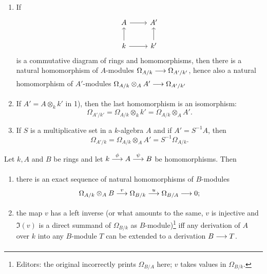 \documentclass[../main]{subfiles}
\begin{document}
\begin{exercise}
\begin{enumerate}[label = \arabic*)]
    \item\label{exe:26.01} If \[\begin{tikzcd}A \arrow[r] &A' \\ k \arrow[u] \arrow[r] &k'\arrow[u] \end{tikzcd}\] is a commutative diagram of rings and homomorphisms, then there is a natural homomorphism of $A$-modules $\Omega_{A / k} \varrightarrow{} \Omega_{A' / k'}$, hence also a natural homomorphism of $A'$-modules $\Omega_{A / k} \otimes_AA' \varrightarrow{} \Omega_{A' / k'}$

    \item\label{exe:26.02} If $A'=A\otimes_k k'$ in 1), then the last homomorphism is an isomorphism: \[\Omega_{A' / k'}=\Omega_{A / k} \otimes_k k'=\Omega_{A / k} \otimes_A A'.\]

    \item\label{exe:26.03} If $S$ is a multiplicative set in a $k$-algebra $A$ and if $A'=S^{-1} A$, then \[\Omega_{A' / k}=\Omega_{A / k} \otimes_A A'=S^{-1} \Omega_{A / k}.\]
\end{enumerate}
\end{exercise}

\begin{partheorem}\label{thm:057}
Let $k, A$ and $B$ be rings and let $k \varrightarrow{\phi} A \varrightarrow{\psi} B$ be homomorphisms. Then
\begin{enumerate}
    \item there is an exact sequence of natural homomorphisms of $B$-modules \[\Omega_{A / k} \otimes_A B\varrightarrow{v} \Omega_{B / k} \varrightarrow{u} \Omega_{B / A} \varrightarrow{} 0 ;\]
    
    \item the map $v$ has a left inverse (or what amounts to the same, $v$ is injective and $\Im(v)$ is a direct summand of $\Omega_{B / k}$ as $B$-module)\footnote{Editors: the original incorrectly prints $\Omega_{B/A}$ here; $v$ takes values in $\Omega_{B/k}$.} iff any derivation of $A$ over $k$ into any $B$-module $T$ can be extended to a derivation $B \varrightarrow{} T$.
\end{enumerate}
\end{partheorem}
\end{document}
